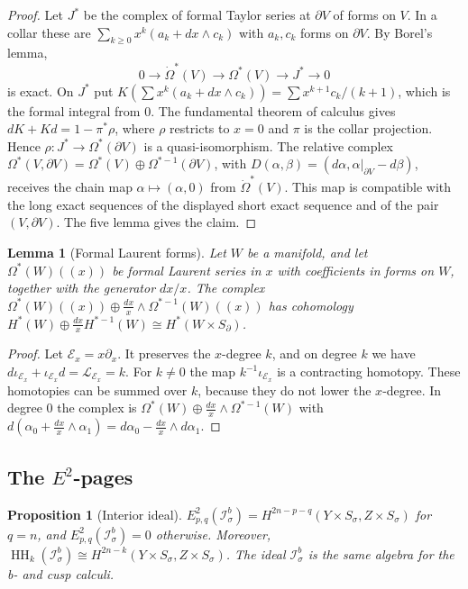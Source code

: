 \documentclass[11pt,oneside,reqno]{article}
\DeclareMathOperator{\HH}{HH}
\newcommand{\Isb}{\mathcal I^b_\sigma}
\theoremstyle{plain}
\newtheorem{proposition}[theorem]{Proposition}
\newtheorem{lemma}[theorem]{Lemma}
\theoremstyle{definition}
\theoremstyle{remark}
\begin{document}
\begin{proof}
Let \(J^*\) be the complex of formal Taylor series at \(\partial V\) of
forms on \(V\). In a collar these are
\(\sum_{k\geq0}x^k(a_k+dx\wedge c_k)\) with \(a_k,c_k\) forms on
\(\partial V\). By Borel's lemma,
\[
 0\to\dot\Omega^*(V)\to\Omega^*(V)\to J^*\to0
\]
is exact. On \(J^*\) put \(K(\sum x^k(a_k+dx\wedge c_k))=\sum
x^{k+1}c_k/(k+1)\), which is the formal integral from \(0\). The
fundamental theorem of calculus gives \(dK+Kd=1-\pi^*\rho\), where \(\rho\)
restricts to \(x=0\) and \(\pi\) is the collar projection. Hence
\(\rho:J^*\to\Omega^*(\partial V)\) is a quasi-isomorphism. The relative
complex \(\Omega^*(V,\partial V)=\Omega^*(V)\oplus\Omega^{*-1}(\partial V)\),
with \(D(\alpha,\beta)=(d\alpha,\alpha|_{\partial V}-d\beta)\), receives the
chain map \(\alpha\mapsto(\alpha,0)\) from \(\dot\Omega^*(V)\). This map is
compatible with the long exact sequences of the displayed short exact
sequence and of the pair \((V,\partial V)\). The five lemma gives the
claim.
\end{proof}

\begin{lemma}[Formal Laurent forms]\label{lem:formal}
Let \(W\) be a manifold, and let \(\Omega^*(W)((x))\) be formal Laurent
series in \(x\) with coefficients in forms on \(W\), together with the
generator \(dx/x\). The complex
\(\Omega^*(W)((x))\oplus\frac{dx}{x}\wedge\Omega^{*-1}(W)((x))\) has
cohomology \(H^*(W)\oplus\frac{dx}{x}H^{*-1}(W)\cong H^*(W\times
S_\partial)\).
\end{lemma}

\begin{proof}
Let \(\mathcal E_x=x\partial_x\). It preserves the \(x\)-degree \(k\), and
on degree \(k\) we have \(d\iota_{\mathcal E_x}+\iota_{\mathcal E_x}d=
\mathcal L_{\mathcal E_x}=k\). For \(k\neq0\) the map
\(k^{-1}\iota_{\mathcal E_x}\) is a contracting homotopy. These homotopies
can be summed over \(k\), because they do not lower the \(x\)-degree. In
degree \(0\) the complex is
\(\Omega^*(W)\oplus\frac{dx}{x}\wedge\Omega^{*-1}(W)\) with
\(d(\alpha_0+\frac{dx}{x}\wedge\alpha_1)=d\alpha_0-\frac{dx}{x}\wedge
d\alpha_1\).
\end{proof}

\subsection{\texorpdfstring{The \(E^2\)-pages}{The E2-pages}}

\begin{proposition}[Interior ideal]\label{prop:Is}
\(E^2_{p,q}(\Isb)=H^{2n-p-q}(Y\times S_\sigma,Z\times S_\sigma)\) for
\(q=n\), and \(E^2_{p,q}(\Isb)=0\) otherwise. Moreover,
\(\HH_k(\Isb)\cong H^{2n-k}(Y\times S_\sigma,Z\times S_\sigma)\). The ideal
\(\Isb\) is the same algebra for the b- and cusp calculi.
\end{proposition}
\end{document}
